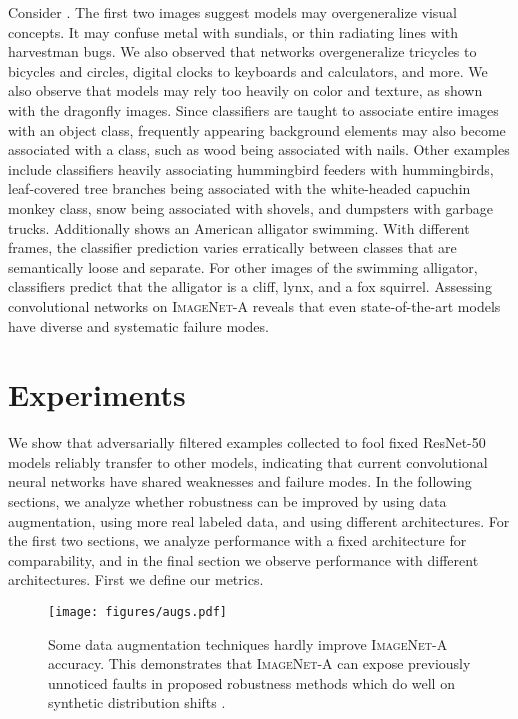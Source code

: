\documentclass[10pt,twocolumn,letterpaper]{article}
\begin{document}
Consider . The first two images suggest models may overgeneralize visual concepts. It may confuse metal with sundials, or thin radiating lines with harvestman bugs. We also observed that networks overgeneralize tricycles to bicycles and circles, digital clocks to keyboards and calculators, and more. We also observe that models may rely too heavily on color and texture, as shown with the dragonfly images. Since classifiers are taught to associate entire images with an object class, frequently appearing background elements may also become associated with a class, such as wood being associated with nails. Other examples include classifiers heavily associating hummingbird feeders with hummingbirds, leaf-covered tree branches being associated with the white-headed capuchin monkey class, snow being associated with shovels, and dumpsters with garbage trucks.
Additionally  shows an American alligator swimming. With different frames, the classifier prediction varies erratically between classes that are semantically loose and separate. For other images of the swimming alligator, classifiers predict that the alligator is a cliff, lynx, and a fox squirrel. 
Assessing convolutional networks on \textsc{ImageNet-A} reveals that even state-of-the-art models have diverse and systematic failure modes.






%
 
\section{Experiments}\label{sec:experiments}
We show that adversarially filtered examples collected to fool fixed ResNet-50 models reliably transfer to other models, indicating that current convolutional neural networks have shared weaknesses and failure modes. In the following sections, we analyze whether robustness can be improved by using data augmentation, using more real labeled data, and using different architectures. For the first two sections, we analyze performance with a fixed architecture for comparability, and in the final section we observe performance with different architectures. First we define our metrics.

\begin{figure*}[t]
\centering
\vspace{-20pt}
\texttt{[image: figures/augs.pdf]}
\caption{Some data augmentation techniques hardly improve \textsc{ImageNet-A} accuracy. This demonstrates that \textsc{ImageNet-A} can expose previously unnoticed faults in proposed robustness methods which do well on synthetic distribution shifts \cite{hendrycks2019augmix}.}\label{fig:aug}
\vspace{-10pt}
\end{figure*}
\end{document}
